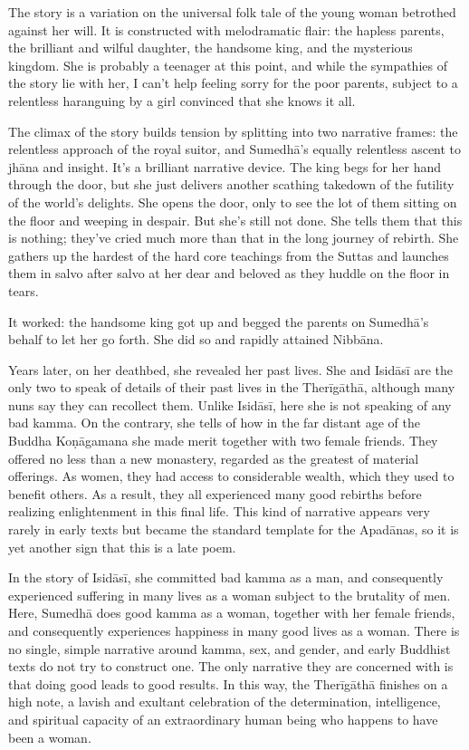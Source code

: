 \documentclass[12pt,openany]{book}%
\begin{document}
The story is a variation on the universal folk tale of the young woman betrothed against her will. It is constructed with melodramatic flair: the hapless parents, the brilliant and wilful daughter, the handsome king, and the mysterious kingdom. She is probably a teenager at this point, and while the sympathies of the story lie with her, I can’t help feeling sorry for the poor parents, subject to a relentless haranguing by a girl convinced that she knows it all.

The climax of the story builds tension by splitting into two narrative frames: the relentless approach of the royal suitor, and \textsanskrit{Sumedhā}’s equally relentless ascent to \textsanskrit{jhāna} and insight. It’s a brilliant narrative device. The king begs for her hand through the door, but she just delivers another scathing takedown of the futility of the world’s delights. She opens the door, only to see the lot of them sitting on the floor and weeping in despair. But she’s still not done. She tells them that this is nothing; they’ve cried much more than that in the long journey of rebirth. She gathers up the hardest of the hard core teachings from the Suttas and launches them in salvo after salvo at her dear and beloved as they huddle on the floor in tears.

It worked: the handsome king got up and begged the parents on \textsanskrit{Sumedhā}’s behalf to let her go forth. She did so and rapidly attained \textsanskrit{Nibbāna}.

Years later, on her deathbed, she revealed her past lives. She and \textsanskrit{Isidāsī} are the only two to speak of details of their past lives in the \textsanskrit{Therīgāthā}, although many nuns say they can recollect them. Unlike \textsanskrit{Isidāsī}, here she is not speaking of any bad kamma. On the contrary, she tells of how in the far distant age of the Buddha \textsanskrit{Koṇāgamana} she made merit together with two female friends. They offered no less than a new monastery, regarded as the greatest of material offerings. As women, they had access to considerable wealth, which they used to benefit others. As a result, they all experienced many good rebirths before realizing enlightenment in this final life. This kind of narrative appears very rarely in early texts but became the standard template for the \textsanskrit{Apadānas}, so it is yet another sign that this is a late poem.

In the story of \textsanskrit{Isidāsī}, she committed bad kamma as a man, and consequently experienced suffering in many lives as a woman subject to the brutality of men. Here, \textsanskrit{Sumedhā} does good kamma as a woman, together with her female friends, and consequently experiences happiness in many good lives as a woman. There is no single, simple narrative around kamma, sex, and gender, and early Buddhist texts do not try to construct one. The only narrative they are concerned with is that doing good leads to good results. In this way, the \textsanskrit{Therīgāthā} finishes on a high note, a lavish and exultant celebration of the determination, intelligence, and spiritual capacity of an extraordinary human being who happens to have been a woman.
\end{document}
